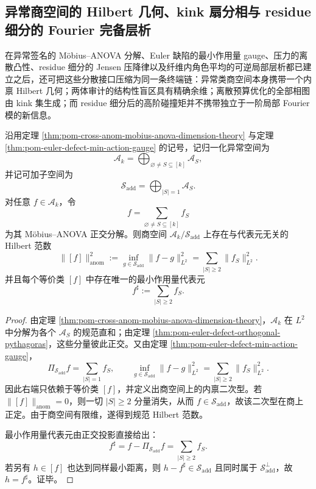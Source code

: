 \subsection{异常商空间的 Hilbert 几何、kink 扇分相与 residue 细分的 Fourier 完备层析}\label{subsec:conclusion-anomaly-hilbert-kink-residue-fourier-completion}
在异常签名的 Möbius--ANOVA 分解、Euler 缺陷的最小作用量 gauge、压力的离散凸性、residue 细分的 Jensen 压降律以及纤维内角色平均的可逆局部层析都已建立之后，还可把这些分散接口压缩为同一条终端链：异常类商空间本身携带一个内禀 Hilbert 几何；两体审计的结构性盲区具有精确余维；离散预算优化的全部相图由 kink 集生成；而 residue 细分后的高阶碰撞矩并不携带独立于一阶局部 Fourier 模的新信息。

\begin{theorem}\label{thm:conclusion-anomaly-quotient-canonical-hilbertization}
沿用定理 \ref{thm:pom-cross-anom-mobius-anova-dimension-theory} 与定理 \ref{thm:pom-euler-defect-min-action-gauge} 的记号，记归一化异常空间为
\[
\mathcal A_k=\bigoplus_{\varnothing\neq S\subseteq[k]}\mathcal A_S,
\]
并记可加子空间为
\[
\mathcal S_{\mathrm{add}}
=
\bigoplus_{|S|=1}\mathcal A_S.
\]
对任意 \(f\in \mathcal A_k\)，令
\[
f=\sum_{\varnothing\neq S\subseteq[k]} f_S
\]
为其 Möbius--ANOVA 正交分解。则商空间 \(\mathcal A_k/\mathcal S_{\mathrm{add}}\) 上存在与代表元无关的 Hilbert 范数
\[
\|[f]\|_{\mathrm{anom}}^2
:=
\inf_{g\in\mathcal S_{\mathrm{add}}}\|f-g\|_{L^2}^2
=
\sum_{|S|\ge 2}\|f_S\|_{L^2}^2.
\]
并且每个等价类 \([f]\) 中存在唯一的最小作用量代表元
\[
f^\sharp:=\sum_{|S|\ge 2}f_S.
\]
\end{theorem}
\begin{proof}
由定理 \ref{thm:pom-cross-anom-mobius-anova-dimension-theory}，\(\mathcal A_k\) 在 \(L^2\) 中分解为各个 \(\mathcal A_S\) 的规范直和；由定理 \ref{thm:pom-euler-defect-orthogonal-pythagoras}，这些分量彼此正交。又由定理 \ref{thm:pom-euler-defect-min-action-gauge}，
\[
\Pi_{\mathcal S_{\mathrm{add}}}f=\sum_{|S|=1}f_S,
\qquad
\inf_{g\in\mathcal S_{\mathrm{add}}}\|f-g\|_{L^2}^2=\sum_{|S|\ge2}\|f_S\|_{L^2}^2.
\]
因此右端只依赖于等价类 \([f]\)，并定义出商空间上的内禀二次型。若 \(\|[f]\|_{\mathrm{anom}}=0\)，则一切 \(|S|\ge2\) 分量消失，从而 \(f\in\mathcal S_{\mathrm{add}}\)，故该二次型在商上正定。由于商空间有限维，遂得到规范 Hilbert 范数。

最小作用量代表元由正交投影直接给出：
\[
f^\sharp=f-\Pi_{\mathcal S_{\mathrm{add}}}f=\sum_{|S|\ge2}f_S.
\]
若另有 \(h\in[f]\) 也达到同样最小距离，则 \(h-f^\sharp\in\mathcal S_{\mathrm{add}}\) 且同时属于 \(\mathcal S_{\mathrm{add}}^\perp\)，故 \(h=f^\sharp\)。证毕。
\end{proof}

